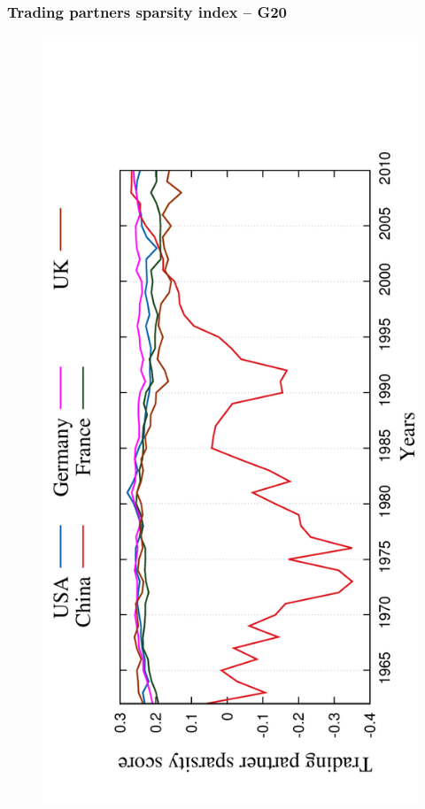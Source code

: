 \documentclass[11pt,xcolor=table]{beamer}
\begin{document}
\begin{frame}
  \frametitle{Trading partners sparsity index -- G20}
  
  \begin{figure}
    \centering
    \includegraphics[angle=-90,scale=0.5]{../code/extra_results/trading_partner_density/scores/g722.pdf}
  \end{figure}

\end{frame}
\end{document}
